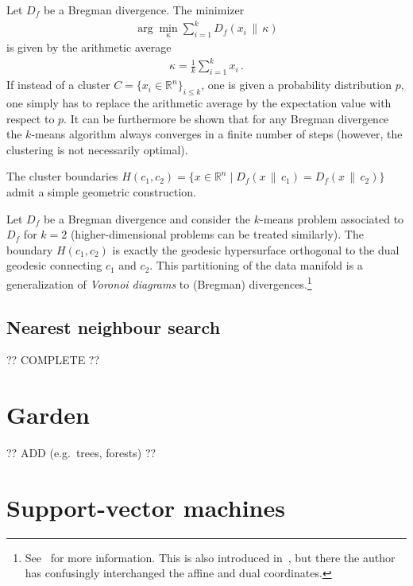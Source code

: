     \begin{property}
        Let $D_f$ be a Bregman divergence. The minimizer
        \begin{gather}
            \arg\min_\kappa\sum_{i=1}^kD_f(x_i\,\|\,\kappa)
        \end{gather}
        is given by the arithmetic average
        \begin{gather}
            \kappa = \frac{1}{k}\sum_{i=1}^kx_i\,.
        \end{gather}
        If instead of a cluster $C=\{x_i\in\mathbb{R}^n\}_{i\leq k}$, one is given a probability distribution $p$, one simply has to replace the arithmetic average by the expectation value with respect to $p$. It can be furthermore be shown that for any Bregman divergence the $k$-means algorithm always converges in a finite number of steps (however, the clustering is not necessarily optimal).
    \end{property}

    The cluster boundaries $H(c_1, c_2)=\{x\in\mathbb{R}^n\mid D_f(x\,\|\,c_1)=D_f(x\,\|\,c_2)\}$ admit a simple geometric construction.
    \begin{property}
        Let $D_f$ be a Bregman divergence and consider the $k$-means problem associated to $D_f$ for $k=2$ (higher-dimensional problems can be treated similarly). The boundary $H(c_1,c_2)$ is exactly the geodesic hypersurface orthogonal to the dual geodesic connecting $c_1$ and $c_2$. This partitioning of the data manifold is a generalization of \textit{Voronoi diagrams} to (Bregman) divergences.\footnote{See~\citet{boissonnat_bregman_2010} for more information. This is also introduced in~\citet{amari_information_2016}, but there the author has confusingly interchanged the affine and dual coordinates.}
    \end{property}

\subsection{Nearest neighbour search}

    ?? COMPLETE ??

\section{Garden}

    ?? ADD (e.g.~trees, forests) ??

\section{Support-vector machines}
